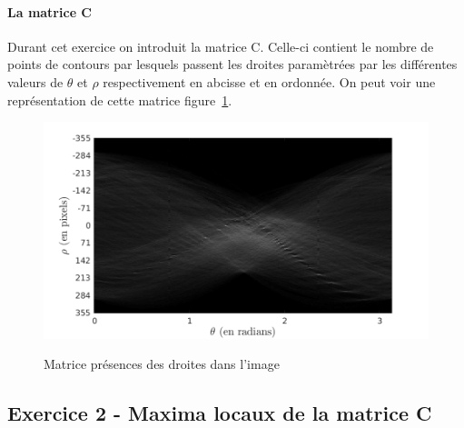 \documentclass{article}
\begin{document}
\paragraph{La matrice C}
Durant cet exercice on introduit la matrice C. Celle-ci contient le nombre de points de contours par lesquels passent les droites paramètrées par les différentes valeurs de $\theta$ et $\rho$ respectivement en abcisse et en ordonnée. On peut voir une représentation de cette matrice figure~\ref{5-C}.
\begin{figure}
	\centering
	\includegraphics[width=0.7\linewidth]{images/5-C.png}
	\label{5-C}
	\caption{Matrice présences des droites dans l'image}
\end{figure}

\subsection{Exercice 2 - Maxima locaux de la matrice C}
\end{document}
